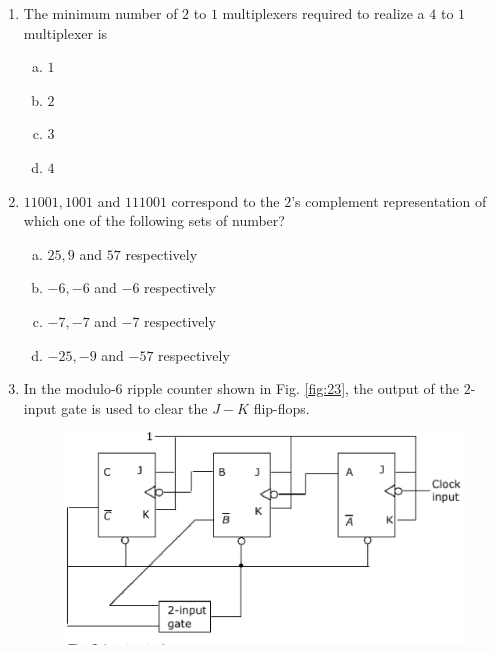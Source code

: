\documentclass[journal,12pt,twocolumn]{IEEEtran}
\begin{document}
\begin{enumerate}
\item The minimum number of $2$ to $1$  multiplexers required to realize a $4$ to $1$ multiplexer is 

\begin{enumerate}[(a)]
 
\item $
1
$

\item $
2
$

\item $
3
$

\item $
4
$


\end{enumerate}

\item $11001,1001$ and $111001$ correspond to the $2$'s complement representation of which one of the following sets of number?

\begin{enumerate}[(a)]
 
\item $25,9$ and $57$ respectively

\item $-6,-6$ and $-6$ respectively

\item $-7,-7$ and $-7$ respectively

\item $-25,-9$ and $-57$ respectively

\end{enumerate}

\item In the modulo-$6$ ripple counter shown in Fig. \ref{fig:23}, the output of the $2$-input gate is used to clear the $J-K$ flip-flops.

\begin{figure}

\centering

\includegraphics[width=\columnwidth]{./figs/27.eps}


\end{figure}
\end{enumerate}
\end{document}
